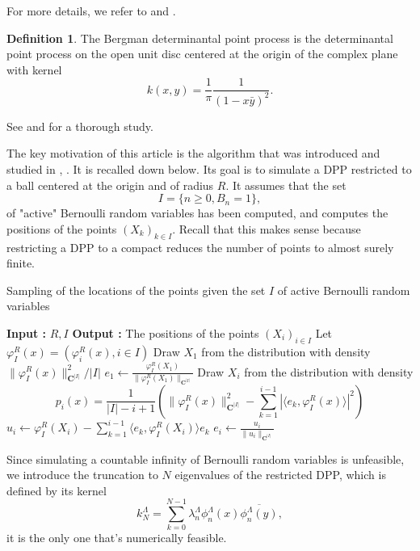 \documentclass[11pt]{article}
\theoremstyle{plain}
\theoremstyle{definition}
\newtheorem{definition}{Definition}
\begin{document}
For more details, we refer to \cite{Hough2006} and \cite{ShiraiTakahashi2003}.

\begin{definition}
    The Bergman determinantal point process is the determinantal point process on the open unit disc centered at the origin of the complex plane with kernel
\[
k(x,y) = \frac{1}{\pi} \frac{1}{(1 - x\bar{y})^2}.
\]
\end{definition}
See \cite{ZerosGaussianPowerSeries} and \cite{Hough2009ZerosGAF} for a thorough study.

The key motivation of this article is the algorithm that was introduced and studied in \cite{DecreusefondVergne2015}, \cite{DecreusefondMoroz2021}. It is recalled down below. Its goal is to simulate a DPP restricted to a ball centered at the origin and of radius $R$. It assumes that the set
\[
I = \{n \ge 0, B_n = 1\},
\]
of "active" Bernoulli random variables has been computed, and computes the positions of the points $(X_k)_{k \in I}$. Recall that this makes sense because restricting a DPP to a compact reduces the number of points to almost surely finite.

\begin{algorithm}
    \caption{Sampling of the locations of the points given the set $I$ of active Bernoulli random variables}
    \begin{algorithmic}[1]
    \State \textbf{Input :} $R, I$
    \State \textbf{Output :} The positions of the points $(X_i)_{i \in I}$
    \State Let $\varphi_I^R(x) = (\varphi_i^R(x), i \in I)$
    \State Draw $X_1$ from the distribution with density $\|\varphi_I^R(x)\|_{\mathbf{C}^{|I|}}^2 / |I|$
    \State $e_1 \leftarrow \frac{\varphi_I^R(X_1)}{\|\varphi_I^R(X_1)\|_{\mathbf{C}^{|I|}}}$
        \State Draw $X_i$ from the distribution with density
        \[ p_i(x) = \frac{1}{|I| - i + 1} \left( \|\varphi_I^R(x)\|_{\mathbf{C}^{|I|}}^2 - \sum_{k=1}^{i-1} |\langle e_k, \varphi_I^R(x) \rangle|^2 \right) \]
        \State $u_i \leftarrow \varphi_I^R(X_i) - \sum_{k=1}^{i-1} \langle e_k, \varphi_I^R(X_i) \rangle e_k$
        \State $e_i \leftarrow \frac{u_i}{\|u_i\|_{\mathbf{C}^{|I|}}}$
    \EndFor
    \end{algorithmic}
\end{algorithm}
  
Since simulating a countable infinity of Bernoulli random variables is unfeasible, we introduce
the truncation to $N$ eigenvalues of the restricted DPP, which is defined by its kernel
\[
k_N^\Lambda = \sum_{k=0}^{N-1} \lambda_n^\Lambda \phi_n^\Lambda(x) \overline{\phi_n^\Lambda(y)},
\]
it is the only one that's numerically feasible.
\end{document}
